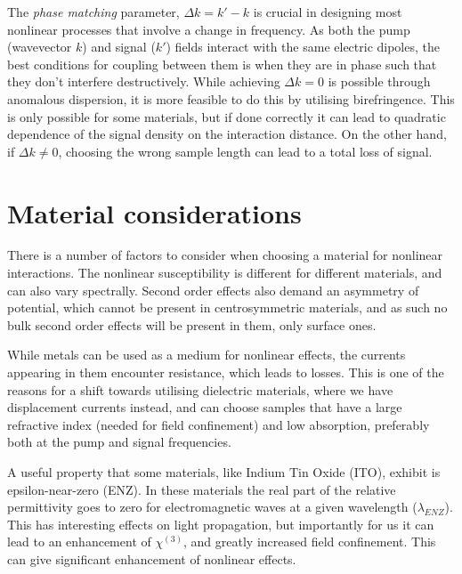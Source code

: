 \documentclass[12pt,a4paper]{article}
\begin{document}
The \emph{phase matching} parameter, $\Delta k = k'-k$ is crucial in designing most nonlinear processes that involve a change in frequency\cite{boydNonlinearOptics2008}. As both the pump (wavevector $k$) and signal ($k'$) fields interact with the same electric dipoles, the best conditions for coupling between them is when they are in phase such that they don't interfere destructively. While achieving $\Delta k=0$ is possible through anomalous dispersion, it is more feasible to do this by utilising birefringence\cite{raoNonlinearFrequencyConversion2004}. This is only possible for some materials, but if done correctly it can lead to quadratic dependence of the signal density on the interaction distance. On the other hand, if $\Delta k\neq 0$, choosing the wrong sample length can lead to a total loss of signal.

\section{Material considerations}
There is a number of factors to consider when choosing a material for nonlinear interactions. The nonlinear susceptibility is different for different materials\cite{burnsThirdHarmonicGenerationAbsorbing1971}, and can also vary spectrally\cite{carnemollaDegenerateOpticalNonlinear2018a}. Second order effects also demand an asymmetry of potential, which cannot be present in centrosymmetric materials, and as such no bulk second order effects will be present in them, only surface ones\cite{boydNonlinearOptics2008}.

While metals can be used as a medium for nonlinear effects, the currents appearing in them encounter resistance, which leads to losses. This is one of the reasons for a shift towards  utilising dielectric materials, where we have displacement currents instead\cite{krasnokAlldielectricOpticalNanoantennas2012,vandegroepDesigningDielectricResonators2013}, and can choose samples that have a large refractive index (needed for field confinement) and low absorption, preferably both at the pump and signal frequencies.

A useful property that some materials, like Indium Tin Oxide (ITO), exhibit is epsilon-near-zero (ENZ). In these materials the real part of the relative permittivity goes to zero for electromagnetic waves at a given wavelength ($\lambda_{ENZ}$). This has interesting effects on light propagation, but importantly for us it can lead to an enhancement of $\chi^{(3)}$, and greatly increased field confinement\cite{reshefNonlinearOpticalEffects2019}. This can give significant enhancement of nonlinear effects.
\end{document}
